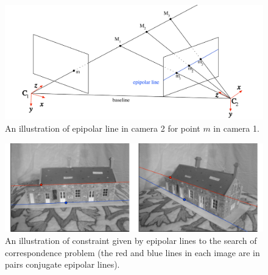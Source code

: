 \begin{figure}[!htbp]
	\begin{center}
		\includegraphics[keepaspectratio,width=\textwidth]{fig/epipolar-lines.pdf}
	\end{center}
	\caption{An illustration of epipolar line in camera 2 for point $m$ in camera 1.}
	\label{fig:epipolar-lines}
\end{figure}

\begin{figure}[!htbp]
	\begin{center}
		\includegraphics[keepaspectratio,width=\textwidth]{fig/epipolar-lines2.pdf}
	\end{center}
	\caption{An illustration of constraint given by epipolar lines to the search of correspondence problem (the red and blue lines in each image are in pairs conjugate epipolar lines).}
	\label{fig:epipolar-lines2}
\end{figure}

